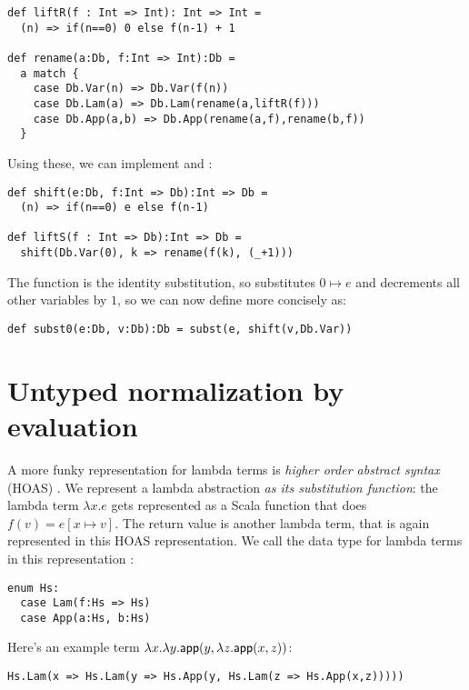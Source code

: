 \begin{lstlisting}
def liftR(f : Int => Int): Int => Int =
  (n) => if(n==0) 0 else f(n-1) + 1

def rename(a:Db, f:Int => Int):Db =
  a match {
    case Db.Var(n) => Db.Var(f(n))
    case Db.Lam(a) => Db.Lam(rename(a,liftR(f)))
    case Db.App(a,b) => Db.App(rename(a,f),rename(b,f))
  }
\end{lstlisting}

Using these, we can implement  and :

\begin{lstlisting}
def shift(e:Db, f:Int => Db):Int => Db =
  (n) => if(n==0) e else f(n-1)

def liftS(f : Int => Db):Int => Db =
  shift(Db.Var(0), k => rename(f(k), (_+1)))
\end{lstlisting}

The function  is the identity substitution, so  substitutes $0 \mapsto e$ and decrements all other variables by $1$, so we can now define  more concisely as:

\begin{lstlisting}
def subst0(e:Db, v:Db):Db = subst(e, shift(v,Db.Var))
\end{lstlisting}

\section{Untyped normalization by evaluation}

A more funky representation for lambda terms is \emph{higher order abstract syntax} (HOAS) \cite{pfenning88}.
We represent a lambda abstraction \emph{as its substitution function}: the lambda term $\lambda x. e$ gets represented as a Scala function that does $f(v) = e[x \mapsto v]$.
The return value is another lambda term, that is again represented in this HOAS representation.
We call the data type for lambda terms in this representation :

\begin{lstlisting}
enum Hs:
  case Lam(f:Hs => Hs)
  case App(a:Hs, b:Hs)
\end{lstlisting}

Here's an example term $\lambda x. \lambda y. \mathsf{app}(y, \lambda z. \mathsf{app}(x,z))$:

\begin{lstlisting}
Hs.Lam(x => Hs.Lam(y => Hs.App(y, Hs.Lam(z => Hs.App(x,z)))))
\end{lstlisting}

